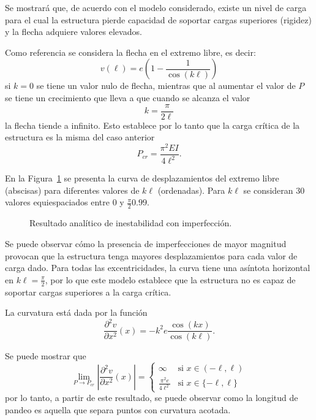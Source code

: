 Se mostrará que, de acuerdo con el modelo considerado, existe un nivel de carga para el cual la estructura pierde capacidad de soportar cargas superiores (rigidez) y la flecha adquiere valores elevados. %
%

Como referencia se considera la flecha en el extremo libre, es decir:
%
\begin{equation}
v(\ell) = e \left( 1- \frac{1}{\cos(k\ell) }  \right)
\end{equation}
%
si $k=0$ se tiene un valor nulo de flecha, mientras que al aumentar el valor de $P$ se tiene un crecimiento que lleva a que cuando se alcanza el valor 
%
\begin{equation}
k = \frac{\pi}{2 \ell }
\end{equation}
%
la flecha tiende a infinito. %
%
Esto establece por lo tanto que la carga crítica de la estructura es la misma del caso anterior
%
\begin{equation}
\boxed{
	P_{cr} = \frac{\pi^2 E I}{4 \ell^2}.
}
\end{equation}


En la Figura~\ref{fig:ejpand} se presenta la curva de desplazamientos del extremo libre (abscisas) para diferentes valores de $k\ell$ (ordenadas). %
%
Para $k\ell$ se consideran 30 valores equiespaciados entre $0$ y $\frac{\pi}{2} 0.99$.

\begin{figure}[htb]
	\centering
		\resizebox{.7\textwidth}{!}{}
	\caption{Resultado analítico de inestabilidad con imperfección.}
	\label{fig:ejpand}
\end{figure}

Se puede observar cómo la presencia de imperfecciones de mayor magnitud provocan que la estructura tenga mayores desplazamientos para cada valor de carga dado. %
%
Para todas las excentricidades, la curva tiene una asíntota horizontal en $k\ell=\frac{\pi}{2}$, por lo que este modelo establece que la estructura no es capaz de soportar cargas superiores a la carga crítica.


La curvatura está dada por la función 
\begin{equation}
\frac{\partial^2 v}{\partial x^2}(x) = -k^2 e \frac{\cos(k x)}{\cos(k\ell)}.
\end{equation}


Se puede mostrar que
\begin{equation}
\lim\limits_{P\rightarrow P_{cr}}
\left| \frac{\partial^2 v}{\partial x^2}(x) \right|
 =
\left\{
\begin{array}{lr}
\infty & \text{si } x \in (-\ell,\ell)\\
\displaystyle \frac{\pi^2 e}{4 \ell^2} & \text{si } x \in \{-\ell,\ell\}
\end{array}
\right.
\end{equation}
%
por lo tanto, a partir de este resultado, se puede observar como la longitud de pandeo es aquella que separa puntos con curvatura acotada.


